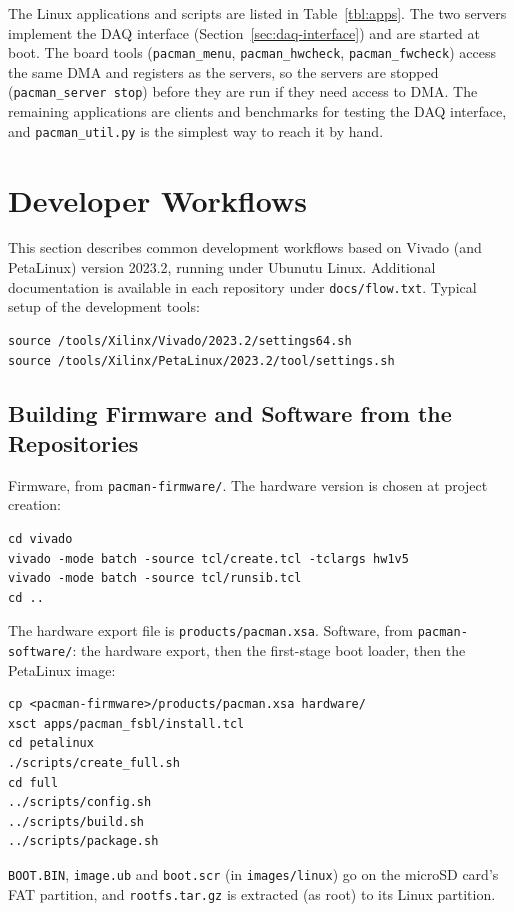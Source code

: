 \documentclass[12pt]{article}
\begin{document}
\noindent
The Linux applications and scripts are listed in Table~\ref{tbl:apps}.  The two servers implement
the DAQ interface (Section~\ref{sec:daq-interface}) and are started at boot.  The board tools
(\texttt{pacman\_menu}, \texttt{pacman\_hwcheck}, \texttt{pacman\_fwcheck}) access the same DMA and
registers as the servers, so the servers are stopped (\texttt{pacman\_server stop}) before they are
run if they need access to DMA.  The remaining applications are clients and benchmarks for testing
the DAQ interface, and \texttt{pacman\_util.py} is the simplest way to reach it by hand.

\section{Developer Workflows}\label{sec:workflows}

This section describes common development workflows based on Vivado (and PetaLinux) version 2023.2,
running under Ubunutu Linux.  Additional documentation is available in each repository under
\texttt{docs/flow.txt}.  Typical setup of the development tools:
\begin{lstlisting}[frame=leftline]
source /tools/Xilinx/Vivado/2023.2/settings64.sh
source /tools/Xilinx/PetaLinux/2023.2/tool/settings.sh
\end{lstlisting}

\subsection{Building Firmware and Software from the Repositories}

Firmware, from \texttt{pacman-firmware/}.  The hardware version is chosen at project creation:
\begin{lstlisting}[frame=leftline]
cd vivado
vivado -mode batch -source tcl/create.tcl -tclargs hw1v5
vivado -mode batch -source tcl/runsib.tcl
cd ..
\end{lstlisting}
The hardware export file is \texttt{products/pacman.xsa}.  Software, from
\texttt{pacman-software/}:  the hardware export, then the first-stage boot loader, then the
PetaLinux image:
\begin{lstlisting}[frame=leftline]
cp <pacman-firmware>/products/pacman.xsa hardware/
xsct apps/pacman_fsbl/install.tcl
cd petalinux
./scripts/create_full.sh
cd full
../scripts/config.sh
../scripts/build.sh
../scripts/package.sh
\end{lstlisting}
\texttt{BOOT.BIN}, \texttt{image.ub} and \texttt{boot.scr} (in \texttt{images/linux}) go on the
microSD card's FAT partition, and \texttt{rootfs.tar.gz} is extracted (as root) to its Linux
partition.
\end{document}
